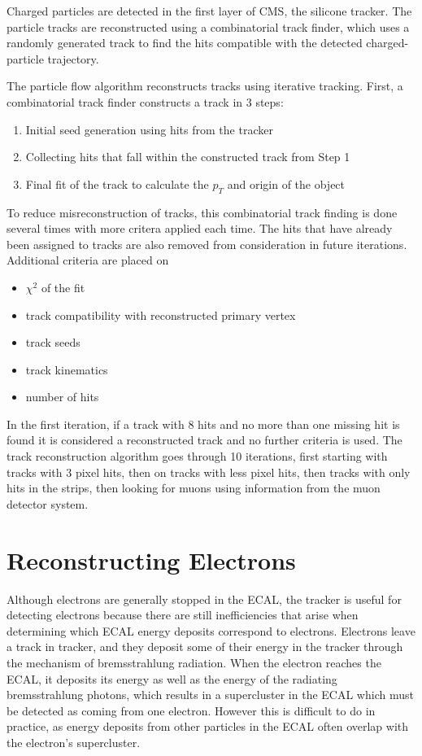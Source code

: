 Charged particles are detected in the first layer of CMS, the silicone tracker. The particle tracks are reconstructed using a combinatorial track finder, which uses a randomly generated track to find the hits compatible with the detected charged-particle trajectory. 


The particle flow algorithm reconstructs tracks using iterative tracking. First, a combinatorial track finder constructs a track in 3 steps:

\begin{enumerate}
	\item Initial seed generation using hits from the tracker
	\item Collecting hits that fall within the constructed track from Step 1
	\item Final fit of the track to calculate the $p_T$ and origin of the object
\end{enumerate}


To reduce misreconstruction of tracks, this combinatorial track finding is done several times with more critera applied each time. The hits that have already been assigned to tracks are also removed from consideration in future iterations. Additional criteria are placed on 

\begin{itemize}
	\item $\chi^2$ of the fit
	\item track compatibility with reconstructed primary vertex
	\item track seeds
	\item track kinematics
	\item number of hits
\end{itemize}

In the first iteration, if a track with 8 hits and no more than one missing hit is found it is considered a reconstructed track and no further criteria is used. The track reconstruction algorithm goes through 10 iterations, first starting with tracks with 3 pixel hits, then on tracks with less pixel hits, then tracks with only hits in the strips, then looking for muons using information from the muon detector system.

\section{Reconstructing Electrons}

Although electrons are generally stopped in the ECAL, the tracker is useful for detecting electrons because there are still inefficiencies that arise when determining which ECAL energy deposits correspond to electrons. Electrons leave a track in tracker, and they deposit some of their energy in the tracker through the mechanism of bremsstrahlung radiation. When the electron reaches the ECAL, it deposits its energy as well as the energy of the radiating bremsstrahlung photons, which results in a supercluster in the ECAL which must be detected as coming from one electron. However this is difficult to do in practice, as energy deposits from other particles in the ECAL often overlap with the electron’s supercluster.

